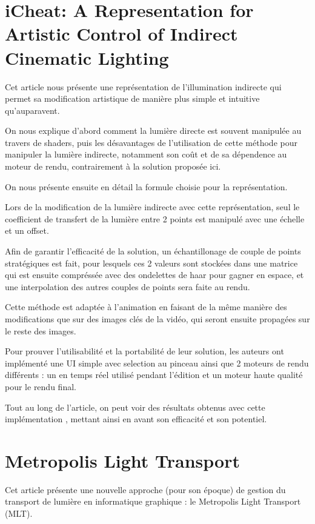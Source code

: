 \documentclass{article}
\begin{document}
\newpage
\section{iCheat: A Representation for Artistic Control of Indirect Cinematic Lighting}

Cet article nous présente une représentation de l'illumination indirecte qui permet sa modification artistique de manière plus simple et intuitive qu'auparavent.

On nous explique d'abord comment la lumière directe est souvent manipulée au travers de shaders, puis les désavantages de l'utilisation de cette méthode pour manipuler la lumière indirecte, notamment son coût et de sa dépendence au moteur de rendu, contrairement à la solution proposée ici.

On nous présente ensuite en détail la formule choisie pour la représentation. 

Lors de la modification de la lumière indirecte avec cette représentation, seul le coefficient de transfert de la lumière entre 2 points est manipulé avec une échelle et un offset.  

Afin de garantir l'efficacité de la solution, un échantillonage de couple de points stratégiques est fait, pour lesquels ces 2 valeurs sont stockées dans une matrice qui est ensuite compréssée avec des ondelettes de haar pour gagner en espace, et une interpolation des autres couples de points sera faite au rendu.

Cette méthode est adaptée à l'animation en faisant de la même manière des modifications que sur des images clés de la vidéo, qui seront ensuite propagées sur le reste des images.

Pour prouver l'utilisabilité et la portabilité de leur solution, les auteurs ont implémenté une UI simple avec selection au pinceau ainsi que 2 moteurs de rendu différents : un en temps réel utilisé pendant l'édition et un moteur haute qualité pour le rendu final.

Tout au long de l'article, on peut voir des résultats obtenus avec cette implémentation , mettant ainsi en avant son efficacité et son potentiel.


\section{Metropolis Light Transport}

Cet article présente une nouvelle approche (pour son époque) de gestion du transport de lumière en informatique graphique : le Metropolis Light Transport (MLT). 
\end{document}
